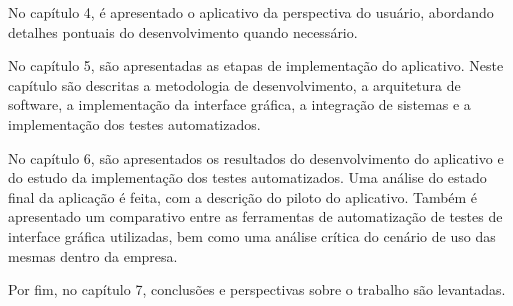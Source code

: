 No capítulo 4, é apresentado o aplicativo da perspectiva do usuário, abordando detalhes pontuais do desenvolvimento quando necessário.

No capítulo 5, são apresentadas as etapas de implementação do aplicativo. Neste capítulo são descritas a metodologia de desenvolvimento, a arquitetura de software, a implementação da interface gráfica, a integração de sistemas e a implementação dos testes automatizados.

No capítulo 6, são apresentados os resultados do desenvolvimento do aplicativo e do estudo da implementação dos testes automatizados. Uma análise do estado final da aplicação é feita, com a descrição do piloto do aplicativo. Também é apresentado um comparativo entre as ferramentas de automatização de testes de interface gráfica utilizadas, bem como uma análise crítica do cenário de uso das mesmas dentro da empresa.

Por fim, no capítulo 7, conclusões e perspectivas sobre o trabalho são levantadas.
